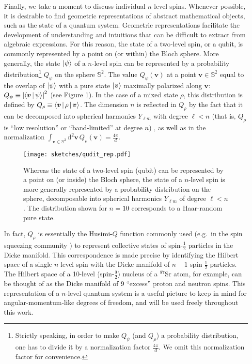 \documentclass[nofootinbib,twocolumn]{revtex4-2}
\newcommand{\p}[1]{\left(#1\right)} %
\newcommand{\bk}{\Braket} %
\renewcommand{\v}{\bm} %
\renewcommand{\dd}{\text{d}} %
\newcommand{\1}{\mathds{1}}
\renewcommand{\SS}{\mathbb{S}}
\begin{document}
Finally, we take a moment to discuss individual $n$-level spins.
Whenever possible, it is desirable to find geometric representations of abstract mathematical objects, such as the state of a quantum system.
Geometric representations facilitate the development of understanding and intuitions that can be difficult to extract from algebraic expressions.
For this reason, the state of a two-level spin, or a qubit, is commonly represented by a point on (or within) the Bloch sphere.
More generally, the state $\ket\psi$ of a $n$-level spin can be represented by a probability distribution\footnote{Strictly speaking, in order to make $Q_\psi$ (and $Q_\rho$) a probability distribution, one has to divide it by a normalization factor $\frac{4\pi}{d}$.
We omit this normalization factor for convenience.} $Q_\psi$ on the sphere $\SS^2$.
The value $Q_\psi\p{\v v}$ at a point $\v v\in\SS^2$ equal to the overlap of $\ket\psi$ with a pure state $\ket{\v v}$ maximally polarized along $\v v$: $Q_\psi\equiv\abs{\bk{\v v|\psi}}^2$ (see Figure \ref{fig:spin_dist}).
In the case of a mixed state $\rho$, this distribution is defined by $Q_\rho\equiv\bk{\v v|\rho|\v v}$.
The dimension $n$ is reflected in $Q_\rho$ by the fact that it can be decomposed into spherical harmonics $Y_{\ell m}$ with degree $\ell<n$ (that is, $Q_\rho$ is ``low resolution'' or ``band-limited'' at degree $n$) \cite{perlin2020qudit}, as well as in the normalization $\int_{\v v\in\SS^2}\dd^2\v v\,Q_\rho\p{\v v}=\frac{4\pi}{d}$.

\begin{figure}
\centering
\texttt{[image: sketches/qudit\_rep.pdf]}
\caption{
Whereas the state of a two-level spin (qubit) can be represented by a point on (or inside) the Bloch sphere, the state of a $n$-level spin is more generally represented by a probability distribution on the sphere, decomposable into spherical harmonics $Y_{\ell m}$ of degree $\ell<n$.
The distribution shown for $n=10$ corresponds to a Haar-random pure state.
}
\label{fig:spin_dist}
\end{figure}

In fact, $Q_\rho$ is essentially the Husimi-$Q$ function commonly used (e.g.~in the spin squeezing community \cite{ma2011quantum}) to represent collective states of spin-$\frac{1}{2}$ particles in the Dicke manifold.
This correspondence is made precise by identifying the Hilbert space of a single $n$-level spin with the Dicke manifold of $n-1$ spin-$\frac{1}{2}$ particles.
The Hilbert space of a 10-level (spin-$\frac92$) nucleus of a ${}^{87}$Sr atom, for example, can be thought of as the Dicke manifold of 9 ``excess'' proton and neutron spins.
This representation of a $n$-level quantum system is a useful picture to keep in mind for angular-momentum-like degrees of freedom, and will be used freely throughout this work.
\end{document}
